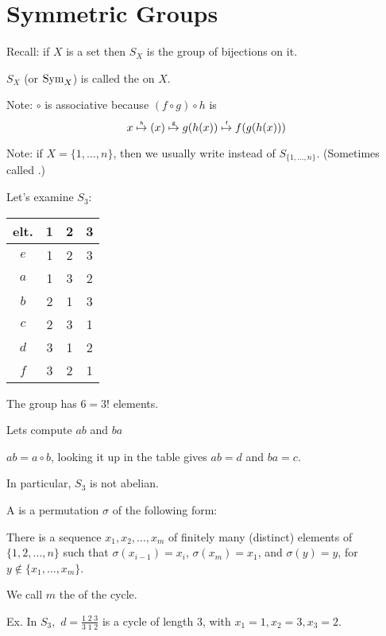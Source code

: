 \documentclass[notes.tex]{subfiles}
\begin{document}
\chapter{Symmetric Groups}

Recall: if $X$ is a set then $S_X$ is the group of bijections on it.
\begin{definition}
	$S_X$ (or $\mathrm{Sym}_X$) is called the  on $X$.
\end{definition}

Note: $\circ$ is associative because $(f\circ g) \circ h$ is $$x\overop{\mapsto}{h}(x)\overop\mapsto{g}g(h(x))\overop\mapsto{f}f(g(h(x)))$$

Note: if $X = \{1, \ldots, n\}$, then we usually write  instead of $S_{\{1, \ldots, n\}}$. (Sometimes called .)

Let's examine $S_3$:

\begin{tabular}{c|ccc}
elt. & 1 & 2 & 3\\\hline
$e$ & 1 & 2 & 3\\
$a$ & 1 & 3 & 2\\
$b$ & 2 & 1 & 3\\
$c$ & 2 & 3 & 1\\
$d$ & 3 & 1 & 2\\
$f$ & 3 & 2 & 1
\end{tabular}

The group has $6 = 3!$ elements.

Lets compute $ab$ and $ba$

$ab = a\circ b$, looking it up in the table gives $ab = d$
 and $ba = c$.

In particular, $S_3$ is not abelian.


\begin{definition}
\label{cycledef}
	A  is a permutation $\sigma$ of the following form:
\end{definition}

There is a sequence $x_1, x_2,\ldots, x_m$ of finitely many (distinct)
elements of $\{1, 2, \ldots, n\}$ such that $\sigma(x_{i-1}) = x_i$, $\sigma(x_m) = x_1$, and $\sigma(y)= y$, for $y\notin \{x_1, \ldots, x_m\}$.

We call $m$ the  of the cycle.

\vspace{0.5em}
Ex. In $S_3,$ $d = \frac{1\;2\;3}{3\;1\;2}$ is a cycle of length 3, with $x_1 =1, x_2=3, x_3=2$.
\end{document}
